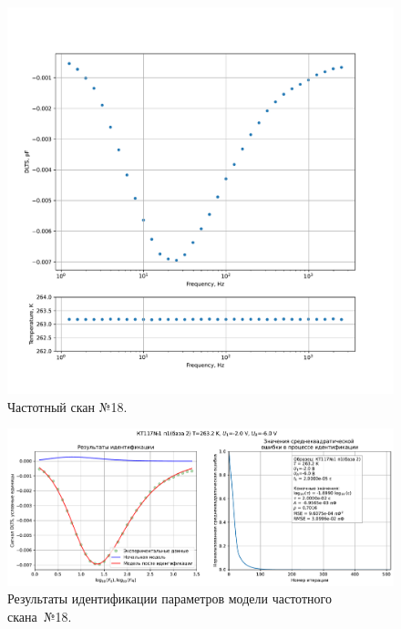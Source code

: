 \begin{figure}[!ht]
    \centering
    \includegraphics[width=1\textwidth]{../plots/КТ117№1_п1(база 2)_2500Гц-1Гц_1пФ_-10С_-2В-6В_100мВ_20мкс_шаг_0,1.pdf}
    \caption{Частотный скан №18.}
    \label{pic:frequency_scan_18}
\end{figure}

\begin{figure}[!ht]
    \centering
    \includegraphics[width=1\textwidth]{../plots/КТ117№1_п1(база 2)_2500Гц-1Гц_1пФ_-10С_-2В-6В_100мВ_20мкс_шаг_0,1_model.pdf}
    \caption{Результаты идентификации параметров модели частотного скана~№18.}
    \label{pic:frequency_scan_model18}
\end{figure}

\pagebreak


